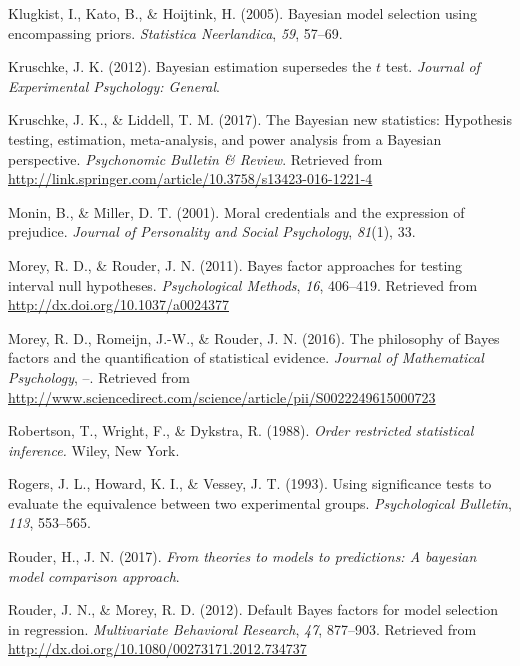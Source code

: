 \documentclass[english,man]{apa6}
\theoremstyle{definition}
\theoremstyle{definition}
\theoremstyle{definition}
\theoremstyle{remark}
\begin{document}
\hypertarget{ref-Klugkist:etal:2005}{}
Klugkist, I., Kato, B., \& Hoijtink, H. (2005). Bayesian model selection
using encompassing priors. \emph{Statistica Neerlandica}, \emph{59},
57--69.

\hypertarget{ref-Kruschke:2012}{}
Kruschke, J. K. (2012). Bayesian estimation supersedes the \(t\) test.
\emph{Journal of Experimental Psychology: General}.

\hypertarget{ref-Kruschke:Liddell:2017}{}
Kruschke, J. K., \& Liddell, T. M. (2017). The Bayesian new statistics:
Hypothesis testing, estimation, meta-analysis, and power analysis from a
Bayesian perspective. \emph{Psychonomic Bulletin \& Review}. Retrieved
from \url{http://link.springer.com/article/10.3758/s13423-016-1221-4}

\hypertarget{ref-Monin:Miller:2001}{}
Monin, B., \& Miller, D. T. (2001). Moral credentials and the expression
of prejudice. \emph{Journal of Personality and Social Psychology},
\emph{81}(1), 33.

\hypertarget{ref-Morey:Rouder:2011}{}
Morey, R. D., \& Rouder, J. N. (2011). Bayes factor approaches for
testing interval null hypotheses. \emph{Psychological Methods},
\emph{16}, 406--419. Retrieved from
\url{http://dx.doi.org/10.1037/a0024377}

\hypertarget{ref-Morey:etal:2016}{}
Morey, R. D., Romeijn, J.-W., \& Rouder, J. N. (2016). The philosophy of
Bayes factors and the quantification of statistical evidence.
\emph{Journal of Mathematical Psychology}, --. Retrieved from
\url{http://www.sciencedirect.com/science/article/pii/S0022249615000723}

\hypertarget{ref-Robertson:etal:1988}{}
Robertson, T., Wright, F., \& Dykstra, R. (1988). \emph{Order restricted
statistical inference.} Wiley, New York.

\hypertarget{ref-Rogers:etal:1993}{}
Rogers, J. L., Howard, K. I., \& Vessey, J. T. (1993). Using
significance tests to evaluate the equivalence between two experimental
groups. \emph{Psychological Bulletin}, \emph{113}, 553--565.

\hypertarget{ref-Rouder:etal:2017}{}
Rouder, H., J. N. (2017). \emph{From theories to models to predictions:
A bayesian model comparison approach}.

\hypertarget{ref-Rouder:Morey:2012}{}
Rouder, J. N., \& Morey, R. D. (2012). Default Bayes factors for model
selection in regression. \emph{Multivariate Behavioral Research},
\emph{47}, 877--903. Retrieved from
\url{http://dx.doi.org/10.1080/00273171.2012.734737}
\end{document}

